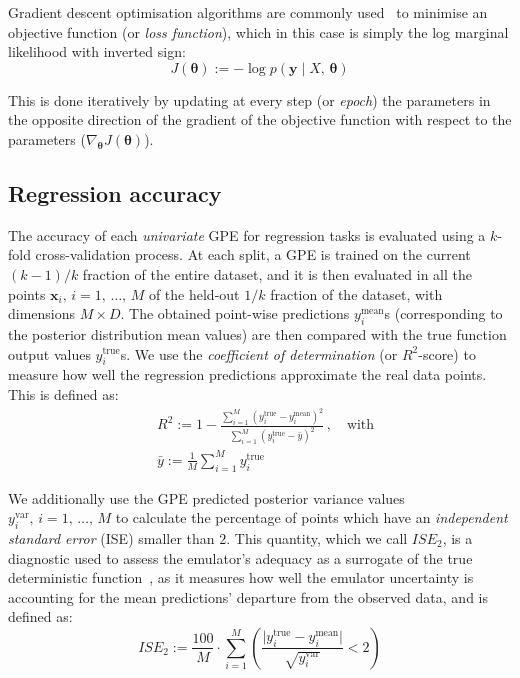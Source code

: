 \noindent
Gradient descent optimisation algorithms are commonly used~\cite{Ruder:2016} to minimise an objective function (or \textit{loss function}), which in this case is simply the log marginal likelihood with inverted sign:
%
\begin{equation}
    J(\boldsymbol{\theta}) := -\log{p(\mathbf{y}\;\vert\; X,\,\boldsymbol{\theta})}
\end{equation}

\noindent
This is done iteratively by updating at every step (or \textit{epoch}) the parameters in the opposite direction of the gradient of the objective function with respect to the parameters ($\nabla_{\boldsymbol{\theta}}J(\boldsymbol{\theta})$).


%
%
%
\subsection{Regression accuracy}\label{sec:ch3regressionaccuracy}
The accuracy of each \textit{univariate} GPE for regression tasks is evaluated using a $k$-fold cross-validation process. At each split, a GPE is trained on the current $(k-1)/k$ fraction of the entire dataset, and it is then evaluated in all the points $\mathbf{x}_i,\,i=1,\,\dots,\,M$ of the held-out $1/k$ fraction of the dataset, with dimensions $M\times D$. The obtained point-wise predictions $y_{i}^{\textrm{mean}}$s (corresponding to the posterior distribution mean values) are then compared with the true function output values $y_{i}^{\textrm{true}}$s. We use the \textit{coefficient of determination} (or $R^2$-score) to measure how well the regression predictions approximate the real data points. This is defined as:
%
\begin{align}
    & R^2 := 1 - \frac{\sum_{i=1}^M(y_{i}^{\textrm{true}}-y_{i}^{\textrm{mean}})^2}{\sum_{i=1}^M(y_{i}^{\textrm{true}} - \bar{y})^2}\,,\quad\text{with} \\
    & \bar{y}:=\frac{1}{M}\sum_{i=1}^M y_{i}^{\textrm{true}}
\end{align}

\noindent
We additionally use the GPE predicted posterior variance values $y_{i}^{\textrm{var}},\,i=1,\,\dots,\,M$ to calculate the percentage of points which have an \textit{independent standard error} (\acs{ISE}) smaller than $2$. This quantity, which we call $ISE_2$, is a diagnostic used to assess the emulator's adequacy as a surrogate of the true deterministic function~\cite{Bastos:2009}, as it measures how well the emulator uncertainty is accounting for the mean predictions' departure from the observed data, and is defined as:
%
\begin{equation}
    ISE_2 := \frac{100}{M}\cdot \sum_{i=1}^M\left(\frac{\vert y_{i}^{\textrm{true}}-y_{i}^{\textrm{mean}}\vert}{\sqrt{y_{i}^{\textrm{var}}}} < 2\right)
\end{equation}

